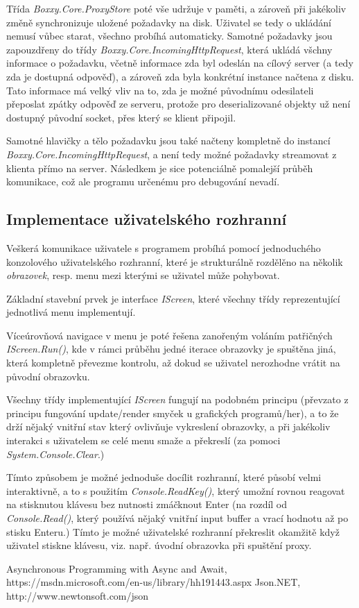 \documentclass{article}
\begin{document}
Třída \emph{Boxxy.Core.ProxyStore} poté vše udržuje v paměti, a zároveň při jakékoliv změně synchronizuje uložené požadavky na disk. Uživatel se tedy o ukládání nemusí vůbec starat, všechno probíhá automaticky. Samotné požadavky jsou zapouzdřeny do třídy \emph{Boxxy.Core.IncomingHttpRequest}, která ukládá všchny informace o požadavku, včetně informace zda byl odeslán na cílový server (a tedy zda je dostupná odpověď), a zároveň zda byla konkrétní instance načtena z disku. Tato informace má velký vliv na to, zda je možné původnímu odesilateli přeposlat zpátky odpověď ze serveru, protože pro deserializované objekty už není dostupný původní socket, přes který se klient připojil.

Samotné hlavičky a tělo požadavku jsou také načteny kompletně do instancí \emph{Boxxy.Core.IncomingHttpRequest}, a není tedy možné požadavky streamovat z klienta přímo na server. Následkem je sice potenciálně pomalejší průběh komunikace, což ale programu určenému pro debugování nevadí.

\subsection{Implementace uživatelského rozhranní}

Veškerá komunikace uživatele s programem probíhá pomocí jednoduchého konzolového uživatelského rozhranní, které je strukturálně rozdělěno na několik \emph{obrazovek}, resp. menu mezi kterými se uživatel může pohybovat.

Základní stavební prvek je interface \emph{IScreen}, které všechny třídy reprezentující jednotlivá menu implementují.

Víceúrovňová navigace v menu je poté řešena zanořeným voláním patřičných \emph{IScreen.Run()}, kde v rámci průběhu jedné iterace obrazovky je spuštěna jiná, která kompletně převezme kontrolu, až dokud se uživatel nerozhodne vrátit na původní obrazovku.

Všechny třídy implementující \emph{IScreen} fungují na podobném principu (převzato z principu fungování update/render smyček u grafických programů/her), a to že drží nějaký vnitřní stav který ovlivňuje vykreslení obrazovky, a při jakékoliv interakci s uživatelem se celé menu smaže a překreslí (za pomoci \emph{System.Console.Clear}.)

Tímto způsobem je možné jednoduše docílit rozhranní, které působí velmi interaktivně, a to s použitím \emph{Console.ReadKey()}, který umožní rovnou reagovat na stisknutou klávesu bez nutnosti zmáčknout Enter (na rozdíl od \emph{Console.Read()}, který používá nějaký vnitřní input buffer a vrací hodnotu až po stisku Enteru.) Tímto je možné uživatelské rozhranní překreslit okamžitě když uživatel stiskne klávesu, viz. např. úvodní obrazovka při spuštění proxy.

\begin{thebibliography}{100}
	 Asynchronous Programming with Async and Await, https://msdn.microsoft.com/en-us/library/hh191443.aspx
	 Json.NET, http://www.newtonsoft.com/json
\end{thebibliography}
\end{document}
